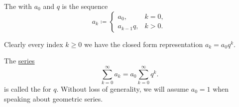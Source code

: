 \begin{definition}\label{def:geometric_progression}
  The  with  \( a_0 \) and  \( q \) is the sequence
  \begin{equation}\label{eq:def:geometric_progression}
    a_k \coloneqq \begin{cases}
      a_0,       & k = 0, \\
      a_{k-1} q, & k > 0.
    \end{cases}
  \end{equation}

  Clearly every index \( k \geq 0 \) we have the closed form representation \( a_k = a_0 q^k \).

  The \hyperref[def:convergent_series]{series}
  \begin{equation}\label{eq:def:geometric_progression/series}
    \sum_{k=0}^\infty a_k = a_0 \sum_{k=0}^\infty q^k.
  \end{equation}
  is called the  for \( q \). Without loss of generality, we will assume \( a_0 = 1 \) when speaking about geometric series.
\end{definition}

